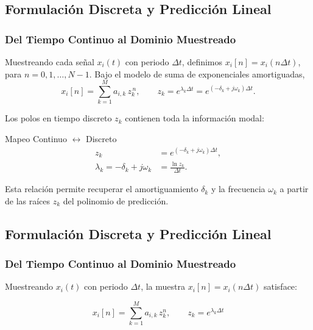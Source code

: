 \subsection{Formulación Discreta y Predicción Lineal}
\subsubsection{Del Tiempo Continuo al Dominio Muestreado}

Muestreando cada señal $x_i(t)$ con periodo $\Delta t$, definimos
$x_i[n] = x_i(n\Delta t)$, para $n = 0,1,\dots,N-1$. 
Bajo el modelo de suma de exponenciales amortiguadas,
\begin{equation}
    x_i[n] = \sum_{k=1}^{M} a_{i,k}\, z_k^{\,n}, \qquad
    z_k = e^{\lambda_k \Delta t} = e^{(-\delta_k + j\omega_k)\Delta t}.
    \label{eq:discrete}
\end{equation}

Los polos en tiempo discreto $z_k$ contienen toda la información modal:

\begin{block}{Mapeo Continuo $\leftrightarrow$ Discreto}
\begin{align}
    z_k &= e^{(-\delta_k + j\omega_k)\Delta t}, \\[4pt]
    \lambda_k = -\delta_k + j\omega_k &= \frac{\ln z_k}{\Delta t}.
    \label{eq:mapping}
\end{align}
\end{block}

Esta relación permite recuperar el amortiguamiento $\delta_k$ y la frecuencia
$\omega_k$ a partir de las raíces $z_k$ del polinomio de predicción.

\subsection{Formulación Discreta y Predicción Lineal}
\subsubsection{Del Tiempo Continuo al Dominio Muestreado}

Muestreando $x_i(t)$ con periodo $\Delta t$, la muestra $x_i[n] = x_i(n\Delta t)$ satisface:

\begin{equation}
    x_i[n] = \sum_{k=1}^{M} a_{i,k}\, z_k^n, \qquad z_k = e^{\lambda_k \Delta t}
    \label{eq:discrete}
\end{equation}

